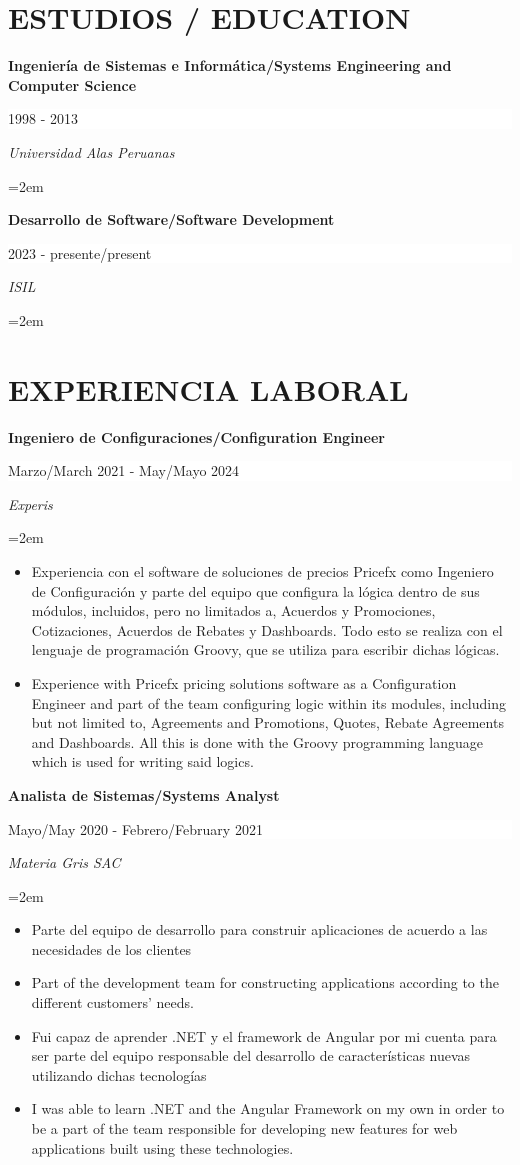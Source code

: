 \documentclass[paper=a4,fontsize=11pt]{scrartcl} %
\newcommand{\sepspace}{\vspace*{1em}}		%
\newcommand{\NewPart}[1]{\section*{\uppercase{#1}}}
\newcommand{\EducationEntry}[4]{
		\noindent \textbf{#1} \hfill      %
		\colorbox{White}{%
			\parbox{7cm}{%
			\hfill\color{Black}#2}} \par  %
		\noindent \textit{#3} \par        %
		\noindent\hangindent=2em\hangafter=0 \small #4 %
		\normalsize \par}
\begin{document}
\sepspace


\NewPart{Estudios / Education}{}

\EducationEntry{Ingeniería de Sistemas e Informática/Systems Engineering and Computer Science}{1998 - 2013}{Universidad Alas Peruanas}{}
\sepspace

\EducationEntry{Desarrollo de Software/Software Development}{2023 - presente/present}{ISIL}{}
\sepspace

\NewPart{Experiencia laboral}{}
\EducationEntry{Ingeniero de Configuraciones/Configuration Engineer}{Marzo/March 2021 - May/Mayo 2024}{Experis}{
\begin{itemize}
\item{Experiencia con el software de soluciones de precios Pricefx como Ingeniero de Configuración y parte del equipo que configura la lógica dentro de sus módulos, incluidos, pero no limitados a, Acuerdos y Promociones, Cotizaciones, Acuerdos de Rebates y Dashboards. Todo esto se realiza con el lenguaje de programación Groovy, que se utiliza para escribir dichas lógicas.}
\item{Experience with Pricefx pricing solutions software as a Configuration Engineer and part of the team configuring logic within its modules, including but not limited to, Agreements and Promotions, Quotes, Rebate Agreements and Dashboards. All this is done with the Groovy programming language which is used for writing said logics.}
\end{itemize}
}
\sepspace

\EducationEntry{Analista de Sistemas/Systems Analyst}{Mayo/May 2020 - Febrero/February 2021}{Materia Gris SAC}{
\begin{itemize}
\item{Parte del equipo de desarrollo para construir aplicaciones de acuerdo a las necesidades de los clientes}
\item{Part of the development team for constructing applications according to the different
customers’ needs.}
\item{Fui capaz de aprender .NET y el framework de Angular por mi cuenta para ser parte del equipo responsable del desarrollo de características nuevas utilizando dichas tecnologías}
\item{I was able to learn .NET and the Angular Framework on my own in order to be a part of the team responsible for developing new features for web applications built using these technologies.}
\end{itemize}
}
\sepspace
\end{document}

